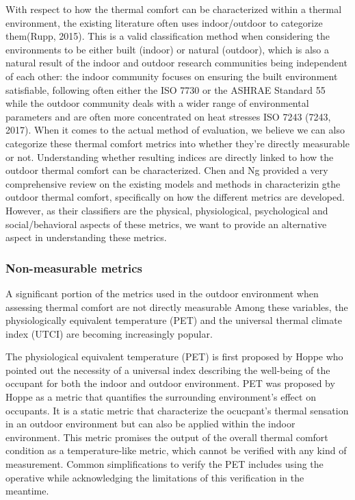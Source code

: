 With respect to how the thermal comfort can be characterized within a thermal environment, the existing literature often uses indoor/outdoor to categorize them(Rupp, 2015). This is a valid classification method when considering the environments to be either built (indoor) or natural (outdoor), which is also a natural result of the indoor and outdoor research communities being independent of each other: the indoor community focuses on ensuring the built environment satisfiable, following often either the ISO 7730 \cite{iso_iso_2005} or the ASHRAE Standard 55 \cite{ansi/ashrae_standard_2017} while the outdoor community deals with a wider range of environmental parameters and are often more concentrated on heat stresses ISO 7243 (7243, 2017). When it comes to the actual method of evaluation, we believe we can also categorize these thermal comfort metrics into whether they're directly measurable or not. Understanding whether resulting indices are directly linked to how the outdoor thermal comfort can be characterized. Chen and Ng provided a very comprehensive review on the existing models and methods in characterizin gthe outdoor thermal comfort, specifically on how the different metrics are developed. However, as their classifiers are the physical, physiological, psychological and social/behavioral aspects of these metrics, we want to provide an alternative aspect in understanding these metrics. 

\subsubsection{Non-measurable metrics}
    A significant portion of the metrics used in the outdoor environment when assessing thermal comfort are not directly measurable
    Among these variables, the physiologically equivalent temperature (PET) and the universal thermal climate index (UTCI) are becoming increasingly popular.
    
    The physiological equivalent temperature (PET) is first proposed by Hoppe who pointed out the necessity of a universal index describing the well-being of the occupant for both the indoor and outdoor environment. PET was proposed by Hoppe\cite{h._hoppe_new_1992} as a metric that quantifies the surrounding environment's effect on occupants. It is a static metric that characterize the ocucpant's thermal sensation in an outdoor environment but can also be applied within the indoor environment. This metric promises the output of the overall thermal comfort condition as a temperature-like metric, which cannot be verified with any kind of measurement. Common simplifications to verify the PET includes using the operative while acknowledging the limitations of this verification in the meantime. 

